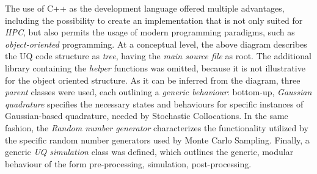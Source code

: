 	The use of C++ as the development language offered multiple advantages, including the possibility to create an implementation that is not only suited for \emph{HPC}, but also permits the usage of modern programming paradigms, such as \emph{object-oriented} programming. 
	At a conceptual level, the above diagram describes the UQ code structure as \emph{tree}, having the \emph{main source file} as root. The additional library containing the \emph{helper} functions was omitted, because it is not illustrative for the object oriented structure. As it can be inferred from the diagram, three \emph{parent} classes were used, each outlining a \emph{generic behaviour}: bottom-up, \emph{Gaussian quadrature} specifies the necessary states and behaviours for specific instances of Gaussian-based quadrature, needed by Stochastic Collocations. In the same fashion, the \emph{Random number generator} characterizes the functionality utilized by the specific random number generators used by Monte Carlo Sampling. Finally, a generic \emph{UQ simulation} class was defined, which outlines the generic, modular behaviour of the form pre-processing, simulation, post-processing.

